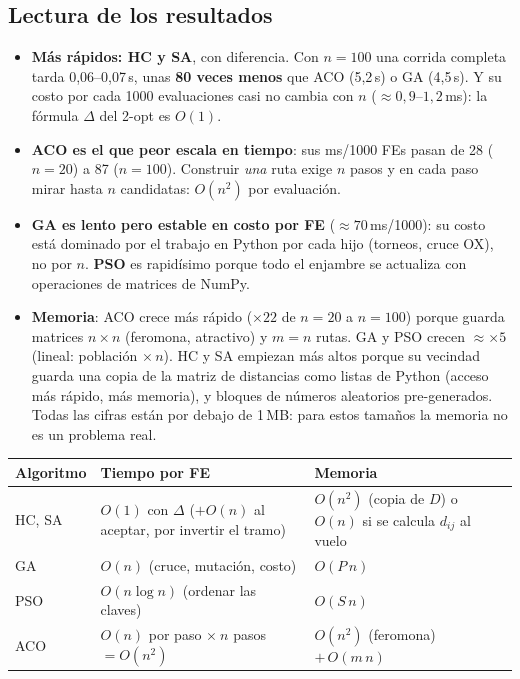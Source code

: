 \documentclass[11pt,a4paper]{article}
\begin{document}
\subsection{Lectura de los resultados}
\begin{itemize}
\item \textbf{Más rápidos: HC y SA}, con diferencia. Con $n=100$ una corrida completa tarda 0{,}06--0{,}07\,s, unas \textbf{80 veces menos} que ACO (5{,}2\,s)
      o GA (4{,}5\,s). Y su costo por cada 1000 evaluaciones casi no cambia con $n$ ($\approx0{,}9$--$1{,}2$\,ms): la fórmula $\Delta$ del 2-opt es $O(1)$.
\item \textbf{ACO es el que peor escala en tiempo}: sus ms/1000 FEs pasan de 28 ($n=20$) a 87 ($n=100$). Construir \emph{una} ruta exige $n$ pasos y en cada paso
      mirar hasta $n$ candidatas: $O(n^2)$ por evaluación.
\item \textbf{GA es lento pero estable en costo por FE} ($\approx70$\,ms/1000): su costo está dominado por el trabajo en Python por cada hijo (torneos, cruce OX),
      no por $n$. \textbf{PSO} es rapidísimo porque todo el enjambre se actualiza con operaciones de matrices de NumPy.
\item \textbf{Memoria}: ACO crece más rápido ($\times22$ de $n=20$ a $n=100$) porque guarda matrices $n\times n$ (feromona, atractivo) y $m=n$ rutas.
      GA y PSO crecen $\approx\times5$ (lineal: población $\times\,n$). HC y SA empiezan más altos porque su vecindad guarda una copia de la matriz de distancias
      como listas de Python (acceso más rápido, más memoria), y bloques de números aleatorios pre-generados.
      Todas las cifras están por debajo de 1\,MB: para estos tamaños la memoria no es un problema real.
\end{itemize}

\begin{mate}
\begin{center}
\begin{tabular}{>{\raggedright}p{1.4cm}>{\raggedright}p{5.9cm}>{\raggedright\arraybackslash}p{5.9cm}}
\toprule
Algoritmo & Tiempo por FE & Memoria \\
\midrule
HC, SA & $O(1)$ con $\Delta$ ($+O(n)$ al aceptar, por invertir el tramo) & $O(n^2)$ (copia de $D$) o $O(n)$ si se calcula $d_{ij}$ al vuelo\\
GA & $O(n)$ (cruce, mutación, costo) & $O(P\,n)$\\
PSO & $O(n\log n)$ (ordenar las claves) & $O(S\,n)$\\
ACO & $O(n)$ por paso $\times\ n$ pasos $=O(n^2)$ & $O(n^2)$ (feromona) $+\,O(m\,n)$\\
\bottomrule
\end{tabular}
\end{center}
\end{mate}
\end{document}
